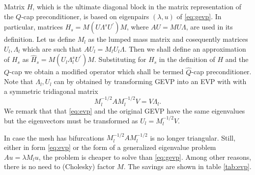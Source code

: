 \documentclass[10pt, a4paper]{article}
\newcommand{\dual}[1]{\ensuremath{{#1}^{\prime}}}
\begin{document}
Matrix $H$, which is the ultimate diagonal block in the matrix representation of
the $Q$-cap preconditioner, is based on eigenpairs $(\lambda, u)$ of
\eqref{eq:gevp}. In particular, matrices $H_s=M(U\Lambda^s \dual{U})M$, where
$AU=MU\Lambda$, are used in its definition. Let us define $M_l$ as the lumped
mass matrix and cosequently matrices $U_l, \Lambda_l$ which are such that
$AU_l=M_l U_l\Lambda$. Then we shall define an approximation of $H_s$ as
$\hat{H}_s=M(U_l\Lambda^s_l\dual{U})M$. Substituting for $H_s$ in the definition
of $H$ and the $Q$-cap we obtain a modified operator which shall be termed 
$\hat{Q}$-cap preconditioner.
Note that $\Lambda_l, U_l$ can by obtained by transforming GEVP into an EVP with 
with a symmetric tridiagonal matrix
\begin{equation}\label{eq:evp}
  M_l^{-1/2}A M_l^{-1/2} V=V\Lambda_l.
\end{equation}
We remark that that \eqref{eq:evp} and the original GEVP have the same
eigenvalues but the eigenvectors must be transformed as $U_l=M_l^{-1/2} V$.

In case the mesh has bifurcations $M_l^{-1/2}A M_l^{-1/2}$ is no longer 
triangular. Still, either in form \eqref{eq:evp} or the form of a
generalized eigenvalue problem $Au=\lambda M_l u$, the problem is cheaper to
solve than \eqref{eq:gevp}. Among other reasons, there is no need to (Cholesky) 
factor $M$. The savings are shown in table \ref{tab:evp}.
\end{document}
